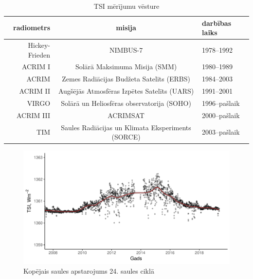 \begin{table}[h]
    \caption{TSI mērījumu vēsture} %
    \begin{center}
    \begin{tabular}{| r | c | l |}
    \hline
    radiometrs & misija & darbības laiks \\ \hline
    Hickey-Frieden & NIMBUS-7 & 1978--1992  \\ \hline
	ACRIM I & Solārā Maksimuma Misija (SMM) & 1980--1989 \\ \hline
	ACRIM  & Zemes Radiācijas Budžeta Satelīts (ERBS) & 1984--2003 \\ \hline
	ACRIM II & Augšējās Atmosfēras Izpētes Satelīts (UARS) & 1991--2001 \\ \hline
	VIRGO & Solārā un Heliosfēras observatorija (SOHO)& 1996--pašlaik \\ \hline
	ACRIM III & ACRIMSAT  & 2000--pašlaik \\ \hline
	TIM & Saules Radiācijas un Klimata Eksperiments (SORCE) & 2003--pašlaik\\ \hline
    \end{tabular}
    \end{center}
    \label{tab:radiometers}
\end{table}




\begin{figure}[h]
    \centering
    \includegraphics[width=\linewidth]{figures/misc/TSI_8-19.pdf}
    \caption{Kopējais saules apstarojums 24. saules ciklā \cite{TSIdata}}
    \label{fig:TSI1}
\end{figure}

